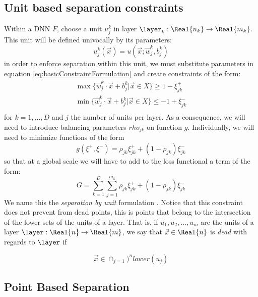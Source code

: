 \subsection{Unit based separation constraints \SepUnit}\label{subsec:sepUnit}
Within a \ReLU DNN $F$, choose a unit $u_j^k$ in layer $\layer_k:\Real{n_k}\rightarrow\Real{m_k}$. This unit will be defined univocally by its parameters:
\begin{equation}\label{eq:unitSepParameterWriting}
    u^k_j(\vec{x}) = u(\vec{x};\vec{w}^k_j,b^k_j)
\end{equation}
in order to enforce separation within this unit, we must substitute parameters in equation \ref{eq:basicConstraintFormulation} and create constraints of the form:
\begin{equation}
    \begin{array}{lcl}
    \max\{\vec{w}^k_j\cdot\vec{x}+b^k_j|\vec{x}\in X\}\geq 1-\xi^{+}_{jk}\\
    \min\{\vec{w}^k_j\cdot\vec{x}+b^k_j|\vec{x}\in X\}\leq -1+\xi^{-}_{jk}\\
\end{array}
\end{equation}
for $k=1,\ldots,D$ and $j$ the number of units per layer. As a consequence, we will need to introduce balancing parameters $rho_{jk}$ on function $g$. Individually, we will need to minimize functions of the form
\begin{equation}
    g(\xi^{+},\xi^{-}) = \rho_{jk}\xi^{+}_{jk}+(1-\rho_{jk})\xi^{-}_{jk}
\end{equation}
so that at a global scale we will have to add to the loss functional a term of the form:
\begin{equation}\label{eq:constraintLossForUnitSeparation}
    G = \sum_{k=1}^{D}\sum_{j=1}^{m_k}\rho_{jk}\xi^{+}_{jk}+(1-\rho_{jk})\xi^{-}_{jk}
\end{equation}
We name this the \emph{separation by unit} formulation \SepUnit. Notice that this constraint does not prevent from dead points, this is points that belong to the intersection of the lower sets of the units of a layer. That is, if $u_1,u_2,\ldots,u_m$ are the units of a layer $\layer:\Real{n}\rightarrow\Real{m}$, we say that $\vec{x}\in\Real{n}$ is \emph{dead} with regards to $\layer$  if

\begin{equation}\label{eq:deadPoint}
 \vec{x}\in \displaystyle\cap_{j=1})^n lower(u_j)
\end{equation}

\subsection{Point Based Separation \SepPoint}\label{subsec:sepPoint}

